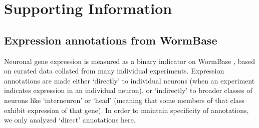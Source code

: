 \documentclass[10pt,letterpaper]{article}
\begin{document}
{





\newpage
\section*{Supporting Information}
\setcounter{figure}{0} \renewcommand{\thefigure}{S\arabic{figure}}
\renewcommand{\thefigure}{S\arabic{figure}}
\renewcommand{\thetable}{S\arabic{table}}

\subsection*{Expression annotations from WormBase}

Neuronal gene expression is measured as a binary indicator on WormBase \cite{Harris:2009kd}, based on curated data collated from many individual experiments.
Expression annotations are made either `directly' to individual neurons (when an experiment indicates expression in an individual neuron), or `indirectly' to broader classes of neurons like `interneuron' or `head' (meaning that some members of that class exhibit expression of that gene).
In order to maintain specificity of annotations, we only analyzed `direct' annotations here.

}
\end{document}
